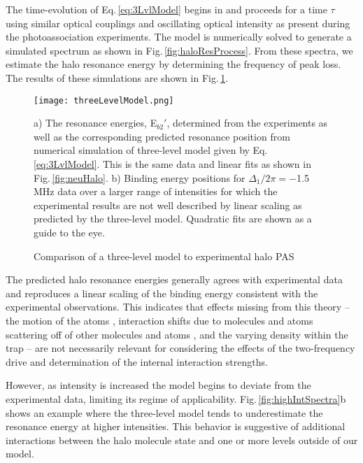 The time-evolution of Eq.\,\ref{eq:3LvlModel} begins in  and proceeds for a time $\tau$ using similar optical couplings and oscillating optical intensity as present during the photoassociation experiments.
The model is numerically solved to generate a simulated spectrum as shown in Fig.\,\ref{fig:haloResProcess}.
From these spectra, we estimate the halo resonance energy by determining the frequency of peak loss.
The results of these simulations are shown in Fig.\,\ref{fig:3LvlModel}.
	\begin{figure}
		\centerline{
		\texttt{[image: threeLevelModel.png]}}
		\caption{Comparison of a three-level model to experimental halo PAS}{a) The resonance energies, E$_{b2}'$, determined from  the experiments as well as the corresponding predicted resonance position from numerical simulation of three-level model given by Eq.\,\ref{eq:3LvlModel}. This is the same data and linear fits as shown in Fig.\,\ref{fig:neuHalo}. b) Binding energy positions for $\Delta_1/2 \pi = -$1.5\,MHz data over a larger range of intensities for which the experimental results are not well described by linear scaling as predicted by the three-level model. Quadratic fits are shown as a guide to the eye.}
		\label{fig:3LvlModel}
	\end{figure} 
The predicted halo resonance energies generally agrees with experimental data and reproduces a linear scaling of the binding energy consistent with the experimental observations.
This indicates that effects missing from this theory – the motion of the atoms \cite{Bohn1996,Bohn1999}, interaction shifts due to molecules and atoms scattering off of other molecules and atoms \cite{wfh00}, and the varying density within the trap \cite{MartinezDeEscobar2008} – are not necessarily relevant for considering the effects of the two-frequency drive and determination of the internal interaction strengths.

However, as intensity is increased the model begins to deviate from the experimental data, limiting its regime of applicability.
Fig.\,\ref{fig:highIntSpectra}b shows an example where the three-level model tends to underestimate the resonance energy at higher intensities.
This behavior is suggestive of additional interactions between the halo molecule state and one or more levels outside of our model.

